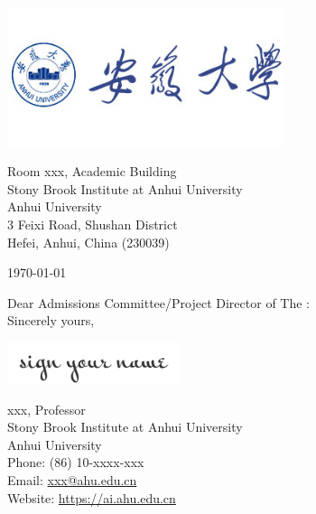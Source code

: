 \documentclass[12pt, a4paper]{letter} %
\begin{document}
    \begin{minipage}{0.5\textwidth}
        \includegraphics[width=3.2in]{pic/Ahu.png}\\ %
    \end{minipage}
    \hfill
    \begin{minipage}{0.6\textwidth}\raggedright
        \small{ 
            \hphantom{AA}Room xxx, Academic Building \\ %
            \hphantom{AA}Stony Brook Institute at Anhui University \\
            \hphantom{AA}Anhui University \\
            \hphantom{AA}3 Feixi Road, Shushan District \\
            \hphantom{AA}Hefei, Anhui, China (230039) \\
        }
    \end{minipage}

    \vspace{0.4in} %

    \today

    Dear Admissions Committee/Project Director of The :\\


    Sincerely yours,

    \includegraphics[width=2in]{pic/signature.png} %

    xxx, Professor \\ %
    Stony Brook Institute at Anhui University \\
    Anhui University \\
    Phone: (86) 10-xxxx-xxx \\ 
    Email: \href{mailto:xxx@ahu.edu.cn}{xxx@ahu.edu.cn} \\
    Website: \url{https://ai.ahu.edu.cn} \\
\end{document}
